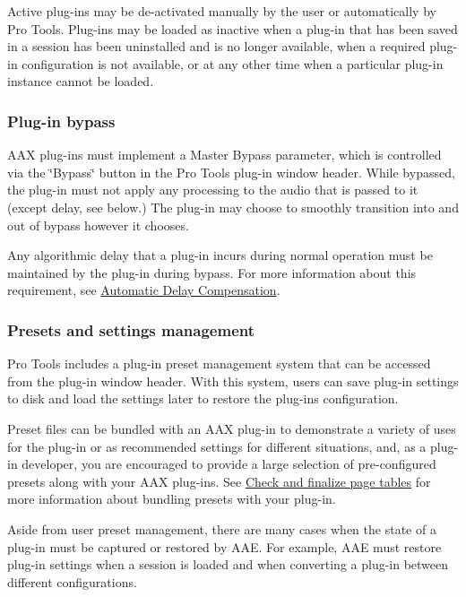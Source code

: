 Active plug-\/ins may be de-\/activated manually by the user or automatically by Pro Tools. Plug-\/ins may be loaded as inactive when a plug-\/in that has been saved in a session has been uninstalled and is no longer available, when a required plug-\/in configuration is not available, or at any other time when a particular plug-\/in instance cannot be loaded.

\hypertarget{a00360_subsection__plugin_bypass}{}\subsubsection{Plug-\/in bypass}\label{a00360_subsection__plugin_bypass}
 A\+A\+X plug-\/ins must implement a Master Bypass parameter, which is controlled via the \char`\"{}\+Bypass\char`\"{} button in the Pro Tools plug-\/in window header. While bypassed, the plug-\/in must not apply any processing to the audio that is passed to it (except delay, see below.) The plug-\/in may choose to smoothly transition into and out of bypass however it chooses.

Any algorithmic delay that a plug-\/in incurs during normal operation must be maintained by the plug-\/in during bypass. For more information about this requirement, see \hyperlink{a00360_subsubsection__automatic_delay_compensation_}{Automatic Delay Compensation}.

\hypertarget{a00360_subsection__presets_and_settings_management}{}\subsubsection{Presets and settings management}\label{a00360_subsection__presets_and_settings_management}
Pro Tools includes a plug-\/in preset management system that can be accessed from the plug-\/in window header. With this system, users can save plug-\/in settings to disk and load the settings later to restore the plug-\/in\textquotesingle{}s configuration.

Preset files can be bundled with an A\+A\+X plug-\/in to demonstrate a variety of uses for the plug-\/in or as recommended settings for different situations, and, as a plug-\/in developer, you are encouraged to provide a large selection of pre-\/configured presets along with your A\+A\+X plug-\/ins. See \hyperlink{a00372_aax_distributing_finishing_pagetables}{Check and finalize page tables} for more information about bundling presets with your plug-\/in.

Aside from user preset management, there are many cases when the state of a plug-\/in must be captured or restored by A\+A\+E. For example, A\+A\+E must restore plug-\/in settings when a session is loaded and when converting a plug-\/in between different configurations.

